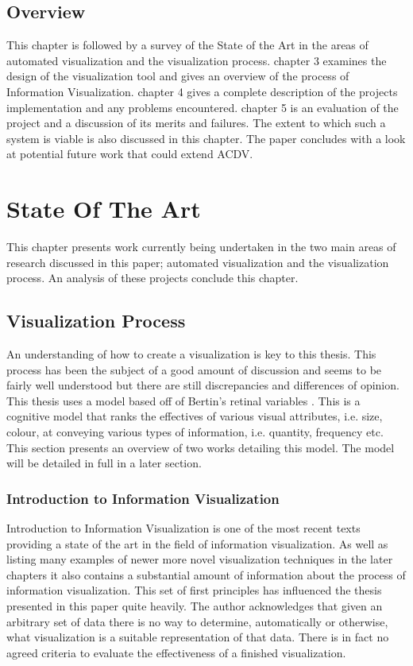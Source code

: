 \documentclass[a4paper, 11pt, titlepage, onehalfspacing]{report}
\begin{document}
	\section{Overview}
 
This chapter is followed by a survey of the State of the Art in the areas of automated visualization and the visualization process. chapter 3 examines the design of the visualization tool and gives an overview of the process of Information Visualization. chapter 4 gives a complete description of the projects implementation and any problems encountered. chapter 5 is an evaluation of the project and a discussion of its merits and failures. The extent to which such a system is viable is also discussed in this chapter. The paper concludes with a look at potential future work that could extend AC\lightning{}DV.


	\chapter{State Of The Art}

This chapter presents work currently being undertaken in the two main areas of research discussed in this paper; automated visualization and the visualization process. An analysis of these projects conclude this chapter.

	\section{Visualization Process}
An understanding of how to create a visualization is key to this thesis. This process has been the subject of a good amount of discussion and seems to be fairly well understood but there are still discrepancies and differences of opinion. This thesis uses a model based off of Bertin's retinal variables \cite{bertin1973semiologie}. This is a cognitive model that ranks the effectives of various visual attributes, i.e. size, colour, at conveying various types of information, i.e. quantity, frequency etc. This section presents an overview of two works detailing this model. The model will be detailed in full in a later section.


\subsection{Introduction to Information Visualization}
\label{Intro_to_info_vis}
Introduction to Information Visualization \cite{mazza2009introduction} is one of the most recent texts providing a state of the art in the field of information visualization. As well as listing many examples of newer more novel visualization techniques in the later chapters it also contains a substantial amount of information about the process of information visualization. This set of first principles has influenced the thesis presented in this paper quite heavily. The author acknowledges that given an arbitrary set of data there is no way to determine, automatically or otherwise, what visualization is a suitable representation of that data. There is in fact no agreed criteria to evaluate the effectiveness of a finished visualization.
\end{document}
